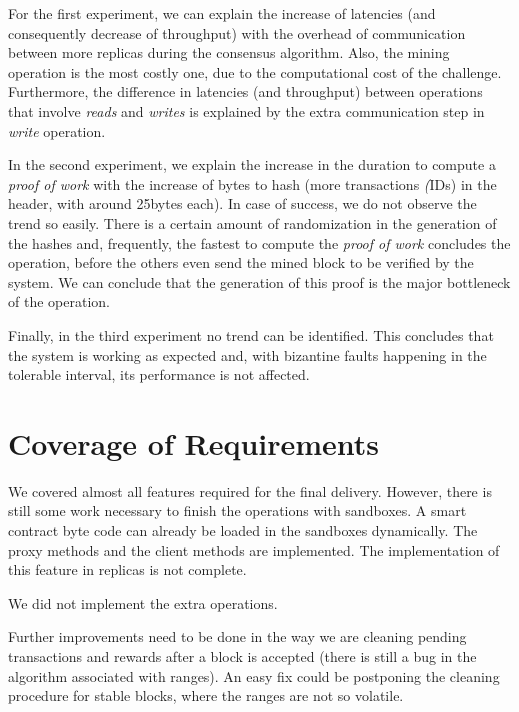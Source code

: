 \documentclass[10pt,journal,compsoc]{IEEEtran}
\begin{document}
	For the first experiment, we can explain the increase of latencies (and consequently decrease of throughput) with the overhead of communication between more replicas during the consensus algorithm. Also, the mining operation is the most costly one, due to the computational cost of the challenge.
	Furthermore, the difference in latencies (and throughput) between operations that involve  \textit{reads} and \textit{writes} is explained by the extra communication step in \textit{write} operation.

	In the second experiment, we explain the increase in the duration to compute a \textit{proof of work} with the increase of bytes to hash (more transactions \textit(IDs) in the header, with around 25bytes each). In case of success, we do not observe the trend so easily. There is a certain amount of randomization in the generation of the hashes and, frequently, the fastest to compute the \textit{proof of work} concludes the operation, before the others even send the mined block to be verified by the system. We can conclude that the generation of this proof is the major bottleneck of the operation.

	Finally, in the third experiment no trend can be identified. This concludes that the system is working as expected and, with bizantine faults happening in the tolerable interval, its performance is not affected.
	
	\section{Coverage of Requirements}
	
	We covered almost all features required for the final delivery. However, there is still some work necessary to finish the operations with sandboxes. A smart contract byte code can already be loaded in the sandboxes dynamically. The proxy methods and the client methods are implemented. The implementation of this feature in replicas is not complete.

	We did not implement the extra operations.


	Further improvements need to be done in the way we are cleaning pending transactions and rewards after a block is accepted (there is still a bug in the algorithm associated with ranges). An easy fix could be postponing the cleaning procedure for stable blocks, where the ranges are not so volatile. 
\end{document}
